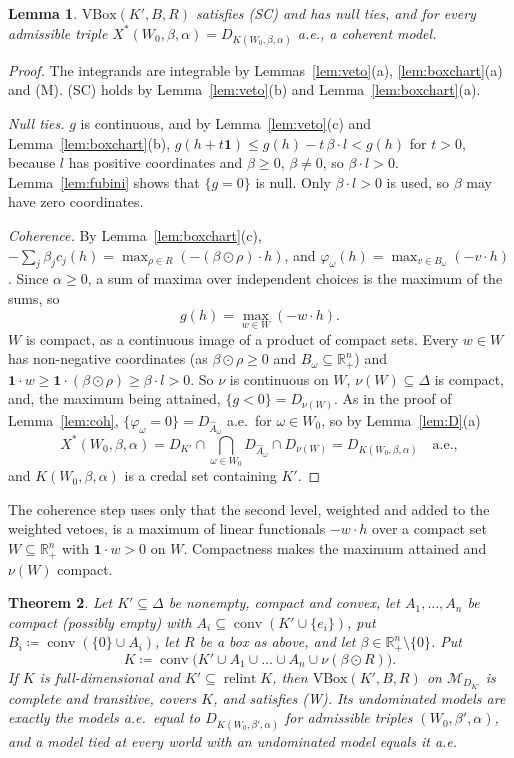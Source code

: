 \documentclass[11pt]{article}
\newcommand{\R}{\mathbb{R}}
\newcommand{\one}{\mathbf{1}}
\newcommand{\M}{\mathcal{M}}
\DeclareMathOperator{\conv}{conv}
\DeclareMathOperator{\relint}{relint}
\theoremstyle{plain}
\newtheorem{theorem}{Theorem}[section]
\newtheorem{lemma}[theorem]{Lemma}
\theoremstyle{definition}
\theoremstyle{remark}
\begin{document}
\begin{lemma}\label{lem:vboxcoh}
$\mathrm{VBox}(K',B,R)$ satisfies (SC) and has null ties, and for every admissible triple
$X^\ast(W_0,\beta,\alpha)=D_{K(W_0,\beta,\alpha)}$ a.e., a coherent model.
\end{lemma}

\begin{proof}
The integrands are integrable by Lemmas~\ref{lem:veto}(a), \ref{lem:boxchart}(a) and (M).
(SC) holds by Lemma~\ref{lem:veto}(b) and Lemma~\ref{lem:boxchart}(a).

\emph{Null ties.} $g$ is continuous, and by Lemma~\ref{lem:veto}(c) and
Lemma~\ref{lem:boxchart}(b), $g(h+t\one)\le g(h)-t\,\beta\cdot l<g(h)$ for $t>0$, because
$l$ has positive coordinates and $\beta\ge0$, $\beta\ne0$, so $\beta\cdot l>0$.
Lemma~\ref{lem:fubini} shows that $\{g=0\}$ is null. Only $\beta\cdot l>0$ is used, so
$\beta$ may have zero coordinates.

\emph{Coherence.} By Lemma~\ref{lem:boxchart}(c), $-\sum_j\beta_jc_j(h)=\max_{\rho\in R}
(-(\beta\odot\rho)\cdot h)$, and $\varphi_\omega(h)=\max_{v\in B_\omega}(-v\cdot h)$. Since
$\alpha\ge0$, a sum of maxima over independent choices is the maximum of the sums, so
\[
  g(h)=\max_{w\in W}(-w\cdot h).
\]
$W$ is compact, as a continuous image of a product of compact sets. Every $w\in W$ has
non-negative coordinates (as $\beta\odot\rho\ge0$ and $B_\omega\subseteq\R^n_+$) and
$\one\cdot w\ge\one\cdot(\beta\odot\rho)\ge\beta\cdot l>0$. So $\nu$ is continuous on $W$,
$\nu(W)\subseteq\Delta$ is compact, and, the maximum being attained, $\{g<0\}=D_{\nu(W)}$.
As in the proof of Lemma~\ref{lem:coh}, $\{\varphi_\omega=0\}=D_{\hat A_\omega}$ a.e.\ for
$\omega\in W_0$, so by Lemma~\ref{lem:D}(a)
\[
  X^\ast(W_0,\beta,\alpha)=D_{K'}\cap\bigcap_{\omega\in W_0}D_{\hat A_\omega}\cap
  D_{\nu(W)}=D_{K(W_0,\beta,\alpha)}\quad\text{a.e.},
\]
and $K(W_0,\beta,\alpha)$ is a credal set containing $K'$.
\end{proof}

The coherence step uses only that the second level, weighted and added to the weighted
vetoes, is a maximum of linear functionals $-w\cdot h$ over a compact set $W\subseteq\R^n_+$
with $\one\cdot w>0$ on $W$. Compactness makes the maximum attained and $\nu(W)$ compact.

\begin{theorem}\label{thm:BX}
Let $K'\subseteq\Delta$ be nonempty, compact and convex, let $A_1,\dots,A_n$ be compact
(possibly empty) with $A_i\subseteq\conv(K'\cup\{e_i\})$, put $B_i\coloneqq\conv(\{0\}
\cup A_i)$, let $R$ be a box as above, and let $\beta\in\R^n_+\setminus\{0\}$. Put
\[
  K\coloneqq\conv\bigl(K'\cup A_1\cup\dots\cup A_n\cup\nu(\beta\odot R)\bigr).
\]
If $K$ is full-dimensional and $K'\subseteq\relint K$, then $\mathrm{VBox}(K',B,R)$ on
$\M_{D_{K'}}$ is complete and transitive, covers $K$, and satisfies (W). Its undominated
models are exactly the models a.e.\ equal to $D_{K(W_0,\beta',\alpha)}$ for admissible
triples $(W_0,\beta',\alpha)$, and a model tied at every world with an undominated model
equals it a.e.
\end{theorem}
\end{document}
